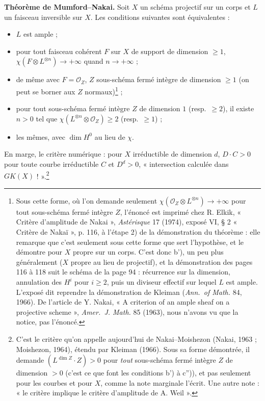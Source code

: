 \documentclass[11pt,a4paper]{article}
\begin{document}
\textbf{Théorème de Mumford--Nakai.} Soit $X$ un schéma projectif sur un corps
et $L$ un faisceau inversible sur $X$. Les conditions suivantes sont
équivalentes :
\begin{itemize}
  \item[a)] $L$ est ample ;
  \item[b)] pour tout faisceau cohérent $F$ sur $X$ de support de dimension
  $\geqslant 1$, $\chi(F \otimes L^{\otimes n}) \to +\infty$ quand $n \to
  +\infty$ ;
  \item[b')] de même avec $F = \mathcal{O}_{Z}$, $Z$ sous-schéma fermé intègre
  de dimension $\geqslant 1$ (on peut se borner aux $Z$ normaux)\footnote{Sous
  cette forme, où l'on demande seulement $\chi(\mathcal{O}_{Z} \otimes
  L^{\otimes n}) \to +\infty$ pour tout sous-schéma fermé intègre $Z$, l'énoncé
  est imprimé chez R. Elkik, « Critère d'amplitude de Nakai », \emph{Astérisque}
  17 (1974), exposé VI, § 2 « Critère de Nakaï », p. 116, à l'étape 2) de la
  démonstration du théorème : elle remarque que c'est seulement sous cette forme
  que sert l'hypothèse, et le démontre pour $X$ propre sur un corps. C'est donc
  b'), un peu plus généralement ($X$ propre au lieu de projectif), et la
  démonstration des pages 116 à 118 suit le schéma de la page 94 : récurrence
  sur la dimension, annulation des $H^{i}$ pour $i \geqslant 2$, puis un diviseur
  effectif sur lequel $L$ est ample. L'exposé dit reprendre la démonstration de
  Kleiman (\emph{Ann.\ of Math.} 84, 1966). De l'article de Y. Nakai, « A
  criterion of an ample sheaf on a projective scheme », \emph{Amer.\ J. Math.}
  85 (1963), nous n'avons vu que la notice, pas l'énoncé.} ;
  \item[b'')] pour tout sous-schéma fermé intègre $Z$ de dimension $1$ (resp.\ $\geqslant 2$), il existe $n > 0$ tel que $\chi(L^{\otimes n} \otimes
  \mathcal{O}_{Z}) \geqslant 2$ (resp.\ $\geqslant 1$) ;
  \item[c), c'), c'')] les mêmes, avec $\dim H^{0}$ au lieu de $\chi$.
\end{itemize}
En marge, le critère numérique : pour $X$ irréductible de dimension $d$, $D
\cdot C > 0$ pour toute courbe irréductible $C$ et $D^{d} > 0$, « intersection
calculée dans $GK(X)$ ! ».\footnote{C'est le critère qu'on appelle aujourd'hui
de Nakai--Moishezon (Nakai, 1963 ; Moishezon, 1964), étendu par Kleiman (1966).
Sous sa forme démontrée, il demande $(L^{\dim Z}\cdot Z) > 0$ pour \emph{tout}
sous-schéma fermé intègre $Z$ de dimension $> 0$ (c'est ce que font les
conditions b') à c'')), et pas seulement pour les courbes et pour $X$, comme
la note marginale l'écrit. Une autre note : « le critère implique le critère
d'amplitude de A. Weil ».}
\end{document}
